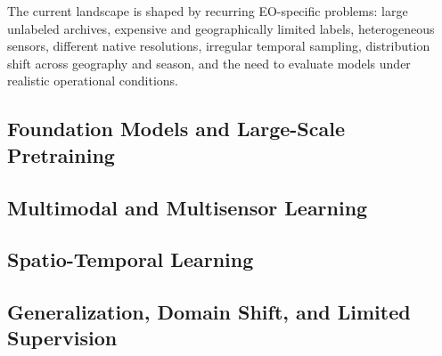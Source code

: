 \documentclass[
    11pt,
    a4paper,
    parskip=half,
    bibliography=totoc,
    numbers=noenddot
]{scrartcl}
\begin{document}
The current landscape is shaped by recurring EO-specific problems:
large unlabeled archives, expensive and geographically limited labels,
heterogeneous sensors, different native resolutions, irregular temporal
sampling, distribution shift across geography and season, and the need
to evaluate models under realistic operational conditions.

\subsection{Foundation Models and Large-Scale Pretraining}


\subsection{Multimodal and Multisensor Learning}


\subsection{Spatio-Temporal Learning}


\subsection{Generalization, Domain Shift, and Limited Supervision}

\end{document}
